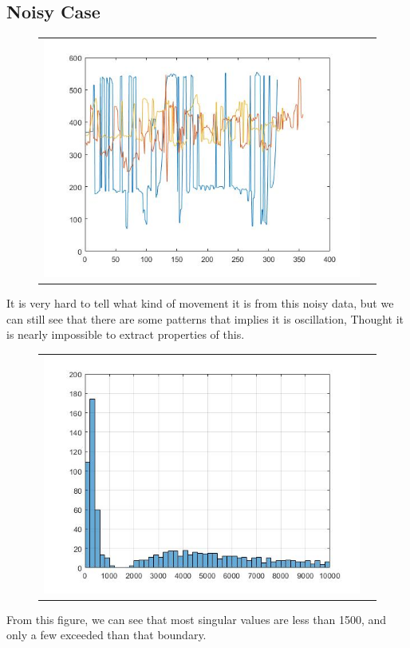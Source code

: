 \documentclass[12pt]{article}
\begin{document}
\subsection{Noisy Case}
\begin{figure}[H]
\begin{tabular}{cc}
  \includegraphics[width=\textwidth]{N_2.jpg}
\end{tabular}
\end{figure}
It is very hard to tell what kind of movement it is from this noisy data, but we can still see that there are some patterns that implies it is oscillation, Thought it is nearly impossible to extract properties of this.
\begin{figure}[H]
\begin{tabular}{cc}
  \includegraphics[width=\textwidth]{N_2_variance.jpg}
\end{tabular}
\end{figure}
From this figure, we can see that most singular values are less than 1500, and only a few exceeded than that boundary.
\end{document}
